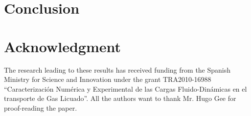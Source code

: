 \documentclass[a4paper,conference]{IEEEtran}
\begin{document}
\section{Conclusion}



\section*{Acknowledgment}
The research  leading  to these results has received funding from the Spanish Ministry for Science and
 Innovation under the grant TRA2010-16988
``Caracterizaci\'on Num\'erica y Experimental de las Cargas Fluido-Din\'amicas en el transporte de Gas Licuado''.
All the authors want to thank Mr. Hugo Gee for proof-reading the paper.




%
%
%
%
%
%
%
%
%
%
%
%
%


\end{document}
